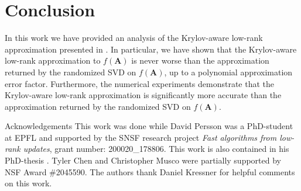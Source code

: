 \section{Conclusion}
In this work we have provided an analysis of the Krylov-aware low-rank approximation presented in \cite{chen_hallman_23}. In particular, we have shown that the Krylov-aware low-rank approximation to $f(\bm{A})$ is never worse than the approximation returned by the randomized SVD on $f(\bm{A})$, up to a polynomial approximation error factor. Furthermore, the numerical experiments demonstrate that the Krylov-aware low-rank approximation is significantly more accurate than the approximation returned by the randomized SVD on $f(\bm{A})$. 

\begin{paragraph}{Acknowledgements}
This work was done while David Persson was a PhD-student at EPFL and supported by the SNSF research project \textit{Fast algorithms from low-rank updates}, grant number: 200020\_178806. This work is also contained in his PhD-thesis \cite{thesis}. Tyler Chen and Christopher Musco were partially supported by NSF Award \#2045590. The authors thank Daniel Kressner for helpful comments on this work. 
\end{paragraph}


